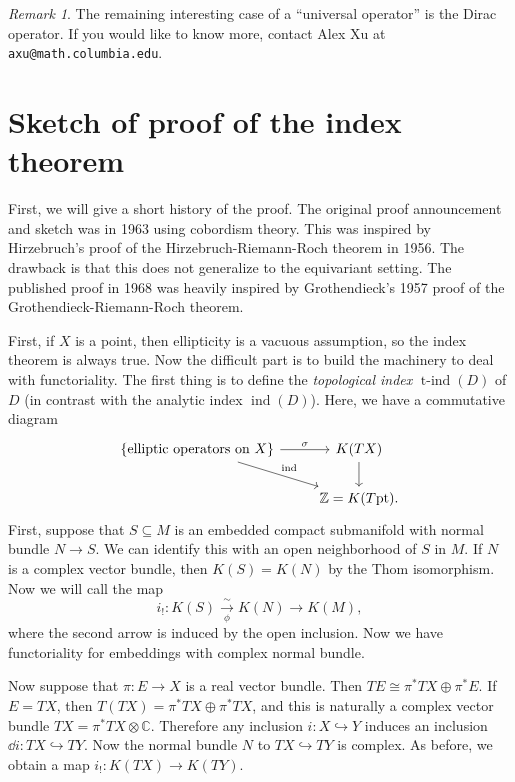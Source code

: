 \documentclass[leqno, openany]{memoir}
\theoremstyle{definition}
\theoremstyle{remark}
\newtheorem{rmk}[thm]{Remark}
\theoremstyle{plain}
\theoremstyle{definition}
\theoremstyle{remark}
\newcommand{\C}{\mathbb{C}}
\newcommand{\Z}{\mathbb{Z}}
\newcommand{\mr}[1]{\mathrm{#1}}
\DeclareMathOperator{\ind}{ind}
\DeclareMathOperator{\tind}{t-ind}
\begin{document}
\begin{rmk} The remaining interesting case of a ``universal operator'' is the
Dirac operator. If you would like to know more, contact Alex Xu at
\texttt{axu@math.columbia.edu}.  \end{rmk}

\section{Sketch of proof of the index theorem}%
\label{sec:sketch_of_proof_of_the_index_theorem}

First, we will give a short history of the proof. The original proof
announcement and sketch was in 1963 using cobordism theory. This was inspired
by Hirzebruch's proof of the Hirzebruch-Riemann-Roch theorem in 1956. The
drawback is that this does not generalize to the equivariant setting. The
published proof in 1968 was heavily inspired by Grothendieck's 1957 proof of
the Grothendieck-Riemann-Roch theorem.

First, if $X$ is a point, then ellipticity is a vacuous assumption, so the
index theorem is always true. Now the difficult part is to build the machinery
to deal with functoriality. The first thing is to define the
\textit{topological index} $\tind(D)$ of $D$ (in contrast with the analytic
index $\ind(D)$). Here, we have a commutative diagram \begin{equation*}
    \begin{tikzcd} \qty{\text{elliptic operators on $X$}} \ar{r}{\sigma}
    \ar{dr}{\ind} & K(TX) \ar{d} \\ & \Z = K(T\mr{pt}).  \end{tikzcd}
\end{equation*} First, suppose that $S \subseteq M$ is an embedded compact
submanifold with normal bundle $N \to S$. We can identify this with an open
neighborhood of $S$ in $M$. If $N$ is a complex vector bundle, then $K(S) =
K(N)$ by the Thom isomorphism. Now we will call the map \[ i_! \colon K(S)
\xrightarrow[\phi]{\sim} K(N) \to K(M), \] where the second arrow is induced by
the open inclusion. Now we have functoriality for embeddings with complex
normal bundle.

Now suppose that $\pi \colon E \to X$ is a real vector bundle. Then $TE \cong
\pi^* TX \oplus \pi^* E$. If $E = TX$, then $T(TX) = \pi^* TX \oplus \pi^* TX$,
and this is naturally a complex vector bundle $TX = \pi^* TX \otimes \C$.
Therefore any inclusion $i \colon X \hookrightarrow Y$ induces an inclusion
$\dd{i} \colon TX \hookrightarrow TY$. Now the normal bundle $N$ to $TX
\hookrightarrow TY$ is complex. As before, we obtain a map $i_! \colon K(TX)
\to K(TY)$.
\end{document}
